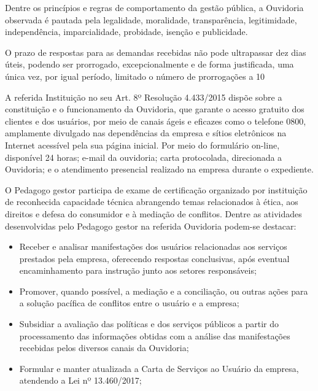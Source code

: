 \begin{refsection}
    Dentre os princípios e regras de comportamento da gestão pública, a Ouvidoria observada é pautada pela legalidade, moralidade, transparência, legitimidade, independência, imparcialidade, probidade, isenção e publicidade. 

    O prazo de respostas para as demandas recebidas não pode ultrapassar dez dias úteis, podendo ser prorrogado, excepcionalmente e de forma justificada, uma única vez, por igual período, limitado o número de prorrogações a 10%

    A referida Instituição no seu Art. 8º Resolução 4.433/2015 dispõe sobre a constituição e o funcionamento da Ouvidoria, que garante o acesso gratuito dos clientes e dos usuários, por meio de canais ágeis e eficazes como o telefone 0800, amplamente divulgado nas dependências da empresa e sítios eletrônicos na Internet acessível pela sua página inicial. Por meio do formulário on-line, disponível 24 horas; e-mail da ouvidoria; carta protocolada, direcionada a Ouvidoria; e o atendimento presencial realizado na empresa durante o expediente. 

    O Pedagogo gestor participa de exame de certificação organizado por instituição de reconhecida capacidade técnica abrangendo temas relacionados à ética, aos direitos e defesa do consumidor e à mediação de conflitos. Dentre as atividades desenvolvidas pelo Pedagogo gestor na referida Ouvidoria podem-se destacar: 

    \begin{itemize}
        \item Receber e analisar manifestações dos usuários relacionadas aos serviços prestados pela empresa, oferecendo respostas conclusivas, após eventual encaminhamento para instrução junto aos setores responsáveis; 

        \item Promover, quando possível, a mediação e a conciliação, ou outras ações para a solução pacífica de conflitos entre o usuário e a empresa; 
    
        \item Subsidiar a avaliação das políticas e dos serviços públicos a partir do processamento das informações obtidas com a análise das manifestações recebidas pelos diversos canais da Ouvidoria; 
    
        \item Formular e manter atualizada a Carta de Serviços ao Usuário da empresa, atendendo a Lei nº 13.460/2017; 
    

\end{itemize}
\end{refsection}
